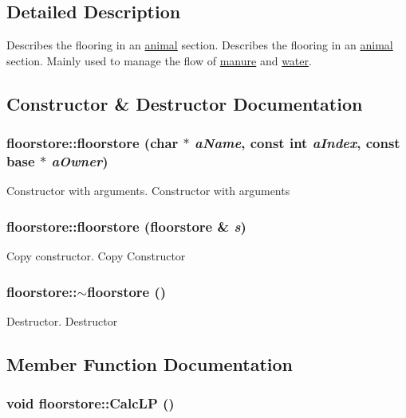 \subsection{Detailed Description}
Describes the flooring in an \hyperlink{classanimal}{animal} section. Describes the flooring in an \hyperlink{classanimal}{animal} section. Mainly used to manage the flow of \hyperlink{classmanure}{manure} and \hyperlink{classwater}{water}. 

\subsection{Constructor \& Destructor Documentation}
\hypertarget{classfloorstore_a4abf691b90bf18a3025e0f0e96dec9c7}{
\subsubsection[{floorstore}]{\setlength{\rightskip}{0pt plus 5cm}floorstore::floorstore (char $\ast$ {\em aName}, \/  const int {\em aIndex}, \/  const {\bf base} $\ast$ {\em aOwner})}}
\label{classfloorstore_a4abf691b90bf18a3025e0f0e96dec9c7}


Constructor with arguments. Constructor with arguments \hypertarget{classfloorstore_a0f20ffd8a3e31dce925bf0959b7cf70b}{
\subsubsection[{floorstore}]{\setlength{\rightskip}{0pt plus 5cm}floorstore::floorstore ({\bf floorstore} \& {\em s})}}
\label{classfloorstore_a0f20ffd8a3e31dce925bf0959b7cf70b}


Copy constructor. Copy Constructor \hypertarget{classfloorstore_ac9fb0eaa78651fdf80a8effbeb77bdd3}{
\subsubsection[{$\sim$floorstore}]{\setlength{\rightskip}{0pt plus 5cm}floorstore::$\sim$floorstore ()}}
\label{classfloorstore_ac9fb0eaa78651fdf80a8effbeb77bdd3}


Destructor. Destructor 

\subsection{Member Function Documentation}
\hypertarget{classfloorstore_a6ed09e1a63924c96ab2da073a89b83db}{
\subsubsection[{CalcLP}]{\setlength{\rightskip}{0pt plus 5cm}void floorstore::CalcLP ()}}
\label{classfloorstore_a6ed09e1a63924c96ab2da073a89b83db}



